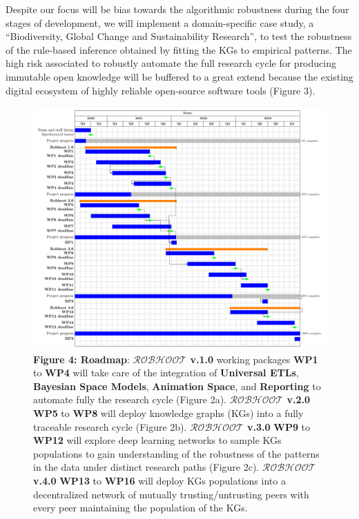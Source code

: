 \documentclass[12pt, a4paper]{article} %
\begin{document}
Despite our focus will be bias towards the algorithmic robustness
during the four stages of development, we will implement a
domain-specific case study, a ``Biodiversity, Global Change and
Sustainability Research'', to test the robustness of the rule-based
inference obtained by fitting the KGs to empirical patterns. The high
risk associated to robustly automate the full research cycle for
producing immutable open knowledge will be buffered to a great extend
because the existing digital ecosystem of highly reliable open-source
software tools (Figure 3).
\begin{figure}[ht]
  \includegraphics[width=1\textwidth]{Figures/GanttChart.pdf}
  {\small {\bf Figure 4: Roadmap}: {\bf $\mathcal{ROBHOOT}$ v.1.0}
    working packages {\bf WP1} to {\bf WP4} will take care of the
    integration of {\bf Universal ETLs}, {\bf Bayesian Space Models},
    {\bf Animation Space}, and {\bf Reporting} to automate fully the
    research cycle (Figure 2a). {\bf $\mathcal{ROBHOOT}$ v.2.0} {\bf
      WP5} to {\bf WP8} will deploy knowledge graphs (KGs) into a
    fully traceable research cycle (Figure 2b). {\bf
      $\mathcal{ROBHOOT}$ v.3.0} {\bf WP9} to {\bf WP12} will explore
    deep learning networks to sample KGs populations to gain
    understanding of the robustness of the patterns in the data under
    distinct research paths (Figure 2c). {\bf $\mathcal{ROBHOOT}$
      v.4.0} {\bf WP13} to {\bf WP16} will deploy KGs populations into
    a decentralized network of mutually trusting/untrusting peers with
    every peer maintaining the population of the KGs.}
\end{figure}
\end{document}
